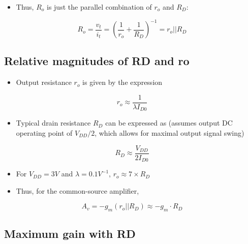 \documentclass[11pt]{article}
\providecommand{\tightlist}{%
      \setlength{\itemsep}{0pt}\setlength{\parskip}{0pt}}
\begin{document}
\begin{itemize}
\tightlist
\item
  Thus, \(R_o\) is just the parallel combination of \(r_o\) and \(R_D\):
\end{itemize}

\begin{equation}
R_o = \dfrac{v_t}{i_t} = \left(\dfrac{1}{r_o}+ \dfrac{1}{R_D} \right)^{-1} = \boxed{r_o || R_D}
\end{equation}

    \hypertarget{relative-magnitudes-of-rd-and-ro}{%
\subsection{Relative magnitudes of RD and
ro}\label{relative-magnitudes-of-rd-and-ro}}

    \begin{itemize}
\tightlist
\item
  Output resistance \(r_o\) is given by the expression
\end{itemize}

\begin{equation}
r_o \approx \dfrac{1}{\lambda I_{D0}}
\end{equation}

\begin{itemize}
\tightlist
\item
  Typical drain resistance \(R_D\) can be expressed as (assumes output
  DC operating point of \(V_{DD}/2\), which allows for maximal output
  signal swing)
\end{itemize}

\begin{equation}
R_D \approx \dfrac{V_{DD}}{2I_{D0}}
\end{equation}

\begin{itemize}
\tightlist
\item
  For \(V_{DD} = 3V\) and \(\lambda = 0.1V^{-1}\),
  \(r_o \approx 7 \times R_D\)
\item
  Thus, for the common-source amplifier,
\end{itemize}

\begin{equation}
\boxed{A_v = -g_m(r_o||R_D) \approx -g_m\cdot R_D}
\end{equation}

    \hypertarget{maximum-gain-with-rd}{%
\subsection{Maximum gain with RD}\label{maximum-gain-with-rd}}
\end{document}
